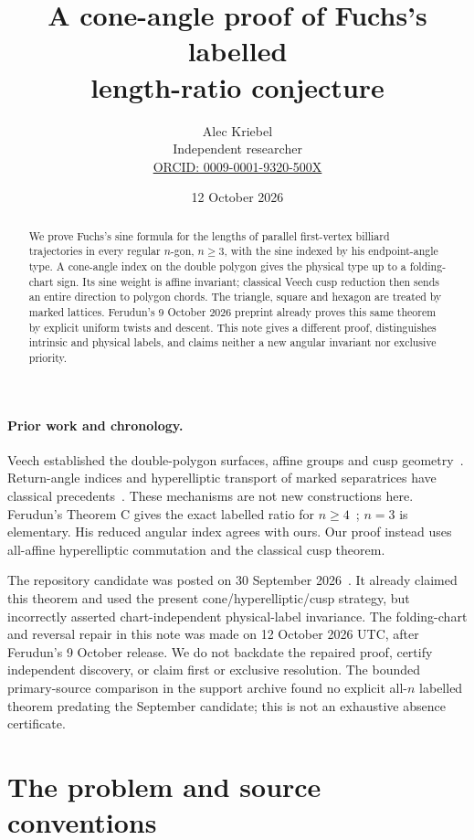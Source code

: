 \documentclass[11pt]{article}
\title{A cone-angle proof of Fuchs's labelled\\length-ratio conjecture}
\author{Alec Kriebel\\\small Independent researcher\\
\small \href{https://orcid.org/0009-0001-9320-500X}{ORCID: 0009-0001-9320-500X}}
\date{12 October 2026}
\begin{document}
\maketitle
\begin{abstract}
We prove Fuchs's sine formula for the lengths of parallel first-vertex billiard trajectories in every regular \(n\)-gon, \(n\ge3\), with the sine indexed by his endpoint-angle type. A cone-angle index on the double polygon gives the physical type up to a folding-chart sign. Its sine weight is affine invariant; classical Veech cusp reduction then sends an entire direction to polygon chords. The triangle, square and hexagon are treated by marked lattices. Ferudun's 9 October 2026 preprint already proves this same theorem by explicit uniform twists and descent. This note gives a different proof, distinguishes intrinsic and physical labels, and claims neither a new angular invariant nor exclusive priority.
\end{abstract}
\paragraph{Prior work and chronology.}
Veech established the double-polygon surfaces, affine groups and cusp geometry~\cite{Veech,Finster}. Return-angle indices and hyperelliptic transport of marked separatrices have classical precedents~\cite{EMZ,Boissy}. These mechanisms are not new constructions here. Ferudun's Theorem C gives the exact labelled ratio for \(n\ge4\)~\cite[Sections~2--3]{Ferudun}; \(n=3\) is elementary. His reduced angular index agrees with ours. Our proof instead uses all-affine hyperelliptic commutation and the classical cusp theorem.

The repository candidate was posted on 30 September 2026~\cite{Repository}. It already claimed this theorem and used the present cone/hyperelliptic/cusp strategy, but incorrectly asserted chart-independent physical-label invariance. The folding-chart and reversal repair in this note was made on 12 October 2026 UTC, after Ferudun's 9 October release. We do not backdate the repaired proof, certify independent discovery, or claim first or exclusive resolution. The bounded primary-source comparison in the support archive found no explicit all-\(n\) labelled theorem predating the September candidate; this is not an exhaustive absence certificate.

\section{The problem and source conventions}
\end{document}
